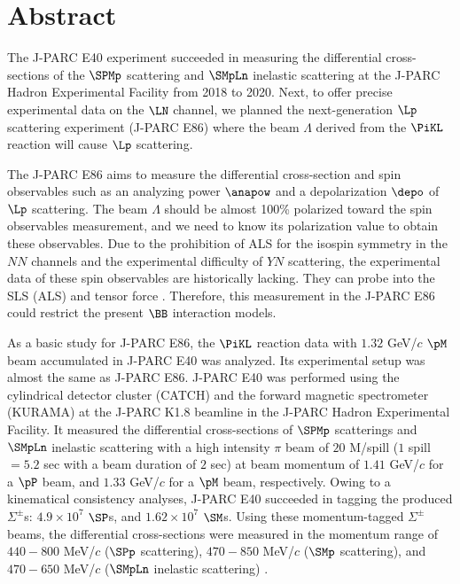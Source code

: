 %

\chapter{Abstract}
The J-PARC E40 experiment succeeded in measuring the differential cross-sections of the $\SPMp$ scattering and $\SMpLn$ inelastic scattering at the J-PARC Hadron Experimental Facility from 2018 to 2020. Next, to offer precise experimental data on the $\LN$ channel, we planned the next-generation $\Lp$ scattering experiment (J-PARC E86) where the beam $\Lambda$ derived from the $\PiKL$ reaction will cause $\Lp$ scattering. 

The J-PARC E86 aims to measure the differential cross-section and spin observables such as an analyzing power $\anapow$ and a depolarization $\depo$ of $\Lp$ scattering. The beam $\Lambda$ should be almost 100\% polarized toward the spin observables measurement, and we need to know its polarization value to obtain these observables. Due to the prohibition of ALS for the isospin symmetry in the $NN$ channels and the experimental difficulty of $YN$ scattering, the experimental data of these spin observables are historically lacking. They can probe into the SLS (ALS) and tensor force \cite{Ishikawa-2004}. Therefore, this measurement in the J-PARC E86 could restrict the present $\BB$ interaction models. 

As a basic study for J-PARC E86, the $\PiKL$ reaction data with $1.32$ GeV/$c$ $\pM$ beam accumulated in J-PARC E40 was analyzed. Its experimental setup was almost the same as J-PARC E86. J-PARC E40 was performed using the cylindrical detector cluster (CATCH) and the forward magnetic spectrometer (KURAMA) at the J-PARC K1.8 beamline in the J-PARC Hadron Experimental Facility. It measured the differential cross-sections of $\SPMp$ scatterings and $\SMpLn$ inelastic scattering with a high intensity $\pi$ beam of $20$ M/spill ($1$ spill $= 5.2$ sec with a beam duration of $2$ sec) at beam momentum of $1.41$ GeV/$c$ for a $\pP$ beam, and $1.33$ GeV/$c$ for a $\pM$ beam, respectively. Owing to a kinematical consistency analyses, J-PARC E40 succeeded in tagging the produced $\Sigma^{\pm}$s: $4.9\times10^7$ $\SP$s, and $1.62\times10^7$ $\SM$s. Using these momentum-tagged $\Sigma^{\pm}$ beams, the differential cross-sections were measured in the momentum range of $440 - 800$ MeV/$c$ ($\SPp$ scattering), $470 - 850$ MeV/$c$ ($\SMp$ scattering), and $470 - 650$ MeV/$c$ ($\SMpLn$ inelastic scattering) \cite{Nana-SPp} \cite{Miwa-SMp} \cite{Miwa-SMLn}. 

